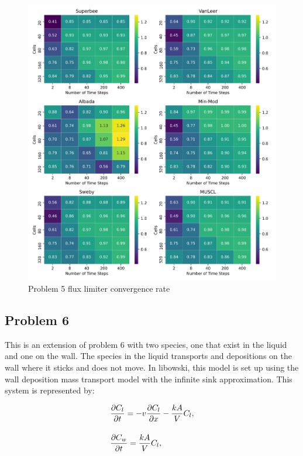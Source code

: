 \begin{figure}[p]
    \centering
    \includegraphics[width=6in]{images/chapter-5/problem5FluxLimiterConvergenceRate.png}
    \caption{Problem 5 flux limiter convergence rate}
    \label{fig:problem5_fluxlimiter_convergence_rate}
\end{figure}

\subsection{Problem 6}
This is an extension of problem 6 with two species, one that exist in the liquid and one on the wall. The species in the liquid transports and depositions on the wall where it sticks and does not move. In libowski, this model is set up using the wall deposition mass transport model with the infinite sink approximation. This system is represented by:

\begin{equation}
\setlength{\jot}{15pt}
\begin{split}
    &\frac{\partial C_{l}}{\partial t} = -v\frac{\partial C_{l}}{\partial x} - \frac{kA}{V} C_{l}, \\
    &\frac{\partial C_{w}}{\partial t} = \frac{kA}{V} C_{l},
\end{split}
\end{equation}

